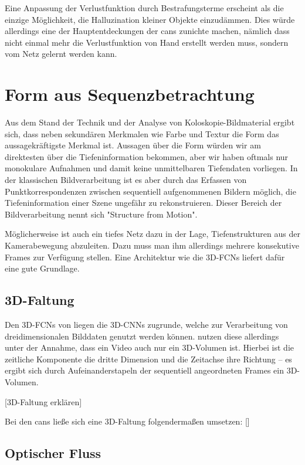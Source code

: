 Eine Anpassung der Verlustfunktion durch Bestrafungsterme erscheint als die einzige Möglichkeit, die Halluzination kleiner Objekte einzudämmen.
Dies würde allerdings eine der Hauptentdeckungen der \glspl{can} zunichte machen, nämlich dass nicht einmal mehr die Verlustfunktion von Hand erstellt werden muss, sondern vom Netz gelernt werden kann.

\section{Form aus Sequenzbetrachtung}

Aus dem Stand der Technik und der Analyse von Koloskopie-Bildmaterial ergibt sich, dass neben sekundären Merkmalen wie Farbe und Textur die Form das aussagekräftigste Merkmal ist.
Aussagen über die Form würden wir am direktesten über die Tiefeninformation bekommen, aber wir haben oftmals nur monokulare Aufnahmen und damit keine unmittelbaren Tiefendaten vorliegen.
In der klassischen Bildverarbeitung ist es aber durch das Erfassen von Punktkorrespondenzen zwischen sequentiell aufgenommenen Bildern möglich, die Tiefeninformation einer Szene ungefähr zu rekonstruieren.
Dieser Bereich der Bildverarbeitung nennt sich "Structure from Motion".

Möglicherweise ist auch ein tiefes Netz dazu in der Lage, Tiefenstrukturen aus der Kamerabewegung abzuleiten.
Dazu muss man ihm allerdings mehrere konsekutive Frames zur Verfügung stellen.
Eine Architektur wie die 3D-FCNs liefert dafür eine gute Grundlage.

\subsection{3D-Faltung}

Den 3D-FCNs von \cite{Lequan.2017} liegen die 3D-CNNs zugrunde, welche zur Verarbeitung von dreidimensionalen Bilddaten genutzt werden können.
\citeauthor{Lequan.2017} nutzen diese allerdings unter der Annahme, dass ein Video auch nur ein 3D-Volumen ist.
Hierbei ist die zeitliche Komponente die dritte Dimension und die Zeitachse ihre Richtung -- es ergibt sich durch Aufeinanderstapeln der sequentiell angeordneten Frames ein 3D-Volumen.

[3D-Faltung erklären]

Bei den \glspl{can} ließe sich eine 3D-Faltung folgendermaßen umsetzen:
[]

\subsection{Optischer Fluss}

